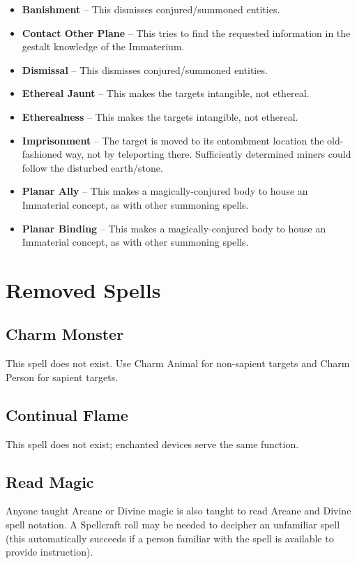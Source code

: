 \begin{itemize}
\item \textbf{Banishment} --
This dismisses conjured/summoned entities.
\item \textbf{Contact Other Plane} --
This tries to find the requested information in the gestalt knowledge of
the Immaterium.
\item \textbf{Dismissal} --
This dismisses conjured/summoned entities.
\item \textbf{Ethereal Jaunt} --
This makes the targets intangible, not ethereal.
\item \textbf{Etherealness} --
This makes the targets intangible, not ethereal.
\item \textbf{Imprisonment} --
The target is moved to its entombment location the old-fashioned way, not
by teleporting there. Sufficiently determined miners could follow the
disturbed earth/stone.
\item \textbf{Planar Ally} --
This makes a magically-conjured body to house an Immaterial concept, as
with other summoning spells.
\item \textbf{Planar Binding} --
This makes a magically-conjured body to house an Immaterial concept, as
with other summoning spells.
\end{itemize}
%

%
%
\section{Removed Spells}

%
\subsection{Charm Monster}

This spell does not exist. Use Charm Animal for non-sapient targets and
Charm Person for sapient targets.
%

%
\subsection{Continual Flame}

This spell does not exist; enchanted devices serve the same function.
%

%
\subsection{Read Magic}

Anyone taught Arcane or Divine magic is also taught to read Arcane and
Divine spell notation. A Spellcraft roll may be needed to decipher an
unfamiliar spell (this automatically succeeds if a person familiar with the
spell is available to provide instruction).

